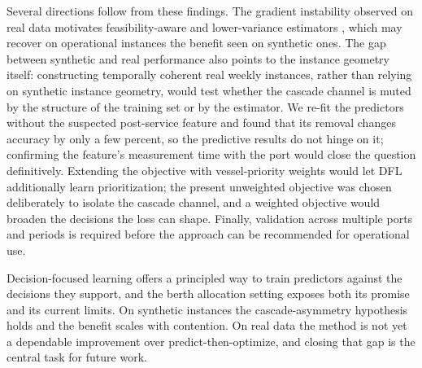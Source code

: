 Several directions follow from these findings. The gradient instability observed on real data motivates feasibility-aware and lower-variance estimators \citep{mandi2025feasibility, berthet2020learning}, which may recover on operational instances the benefit seen on synthetic ones. The gap between synthetic and real performance also points to the instance geometry itself: constructing temporally coherent real weekly instances, rather than relying on synthetic instance geometry, would test whether the cascade channel is muted by the structure of the training set or by the estimator. We re-fit the predictors without the suspected post-service feature and found that its removal changes accuracy by only a few percent, so the predictive results do not hinge on it; confirming the feature's measurement time with the port would close the question definitively. Extending the objective with vessel-priority weights would let DFL additionally learn prioritization; the present unweighted objective was chosen deliberately to isolate the cascade channel, and a weighted objective would broaden the decisions the loss can shape. Finally, validation across multiple ports and periods is required before the approach can be recommended for operational use.

Decision-focused learning offers a principled way to train predictors against the decisions they support, and the berth allocation setting exposes both its promise and its current limits. On synthetic instances the cascade-asymmetry hypothesis holds and the benefit scales with contention. On real data the method is not yet a dependable improvement over predict-then-optimize, and closing that gap is the central task for future work.
